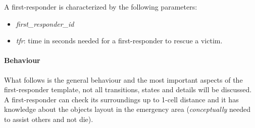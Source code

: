 \noindent
A first-responder is characterized by the following parameters:
\begin{itemize}
	\item \textit{first\_responder\_id}
	\item \textit{tfr}: time in seconds needed for a first-responder to rescue a victim.
\end{itemize}

\paragraph{Behaviour}
What follows is the general behaviour and the most important aspects of the first-responder template, not all transitions, states and details will be discussed.\newline
A first-responder can check its surroundings up to 1-cell distance and it has knowledge about the objects layout in the emergency area (\textit{conceptually} needed to assist others and not die).

